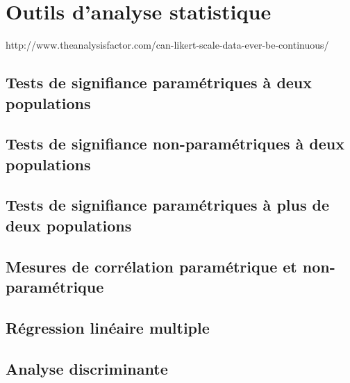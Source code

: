 \chapter{Outils d'analyse statistique}
\label{app:analyseStat}

http://www.theanalysisfactor.com/can-likert-scale-data-ever-be-continuous/

\section{Tests de signifiance paramétriques à deux populations}

\section{Tests de signifiance non-paramétriques à deux populations}

\section{Tests de signifiance paramétriques à plus de deux populations}

\section{Mesures de corrélation paramétrique et non-paramétrique}

\section{Régression linéaire multiple}

\section{Analyse discriminante}